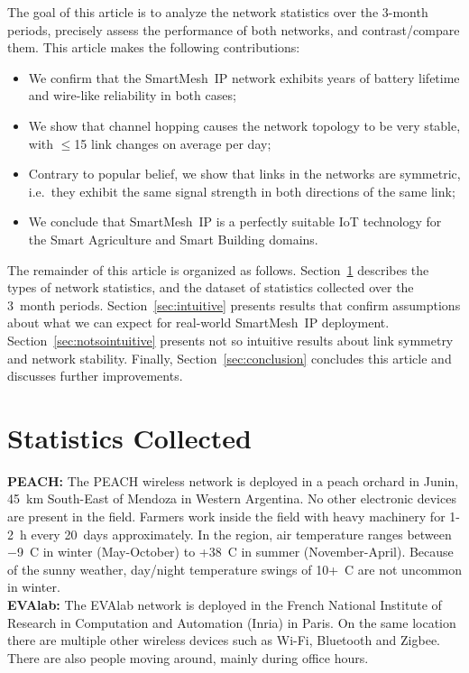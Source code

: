 \documentclass{elsarticle}
\newcommand{\smip}                {SmartMesh~IP\xspace}
\newcommand{\building}            {Smart Building\xspace}
\newcommand{\agri}                {Smart Agriculture\xspace}
\begin{document}
The goal of this article is to analyze the network statistics over the 3-month periods, precisely assess the performance of both networks, and contrast/compare them.
This article makes the following contributions:
\begin{itemize}
    \item We confirm that the \smip network exhibits years of battery lifetime and wire-like reliability in both cases;
    \item We show that channel hopping causes the network topology to be very stable, with $\leq$15 link changes on average per day;
    \item Contrary to popular belief, we show that links in the networks are symmetric, i.e.~they exhibit the same signal strength in both directions of the same link;
    \item We conclude that \smip is a perfectly suitable IoT technology for the \agri and \building domains.
\end{itemize}


The remainder of this article is organized as follows.
Section~\ref{sec:collected} describes the types of network statistics, and the dataset of statistics collected over the 3~month periods.
Section~\ref{sec:intuitive} presents results that confirm assumptions about what we can expect for real-world \smip deployment.
Section~\ref{sec:notsointuitive} presents not so intuitive results about link symmetry and network stability.
Finally, Section~\ref{sec:conclusion} concludes this article and discusses further improvements.

\section{Statistics Collected}
\label{sec:collected}

\textbf{PEACH:}
The PEACH wireless network is deployed in a peach orchard in Junin, 45~km South-East of Mendoza in Western Argentina.
No other electronic devices are present in the field.
Farmers work inside the field with heavy machinery for 1-2~h every 20~days approximately.
In the region, air temperature ranges between $-$9~C in winter (May-October) to +38~C in summer (November-April).
Because of the sunny weather, day/night temperature swings of 10+~C are not uncommon in winter.
\\
\textbf{EVAlab:}
The EVAlab network is deployed in the French National Institute of Research in Computation and Automation (Inria) in Paris.
On the same location there are multiple other wireless devices such as Wi-Fi, Bluetooth and Zigbee.
There are also people moving around, mainly during office hours.
\end{document}

